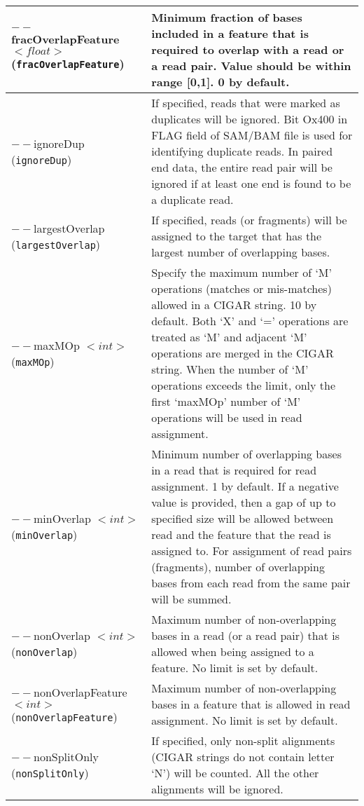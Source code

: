 \documentclass[12pt]{report}
\newcommand{\code}[1]{{\small\texttt{#1}}}
\begin{document}
\begin{longtable}{|p{5cm}|p{11cm}|}
$--$fracOverlapFeature $<float>$ \newline (\code{fracOverlapFeature}) & Minimum fraction of bases included in a feature that is required to overlap with a read or a read pair. Value should be within range [0,1]. 0 by default. \\
\hline
$--$ignoreDup \newline (\code{ignoreDup}) & If specified, reads that were marked as duplicates will be ignored. Bit Ox400 in FLAG field of SAM/BAM file is used for identifying duplicate reads. In paired end data, the entire read pair will be ignored if at least one end is found to be a duplicate read.\\
\hline
$--$largestOverlap \newline (\code{largestOverlap}) & If specified, reads (or fragments) will be assigned to the target that has the largest number of overlapping bases.\\
\hline
$--$maxMOp $<int>$ \newline (\code{maxMOp}) & Specify the maximum number of `M' operations (matches or mis-matches) allowed in a CIGAR string. 10 by default. Both `X' and `=' operations are treated as `M' and adjacent `M' operations are merged in the CIGAR string. When the number of `M' operations exceeds the limit, only the first `maxMOp' number of `M' operations will be used in read assignment.\\
\hline
$--$minOverlap $<int>$ \newline (\code{minOverlap}) & Minimum number of overlapping bases in a read that is required for read assignment. 1 by default. If a negative value is provided, then a gap of up to specified size will be allowed between read and the feature that the read is assigned to. For assignment of read pairs (fragments), number of overlapping bases from each read from the same pair will be summed. \\
\hline
$--$nonOverlap $<int>$ \newline (\code{nonOverlap}) & Maximum number of non-overlapping bases in a read (or a read pair) that is allowed when being assigned to a feature. No limit is set by default. \\
\hline
$--$nonOverlapFeature $<int>$ \newline (\code{nonOverlapFeature}) & Maximum number of non-overlapping bases in a feature that is allowed in read assignment. No limit is set by default. \\
\hline
$--$nonSplitOnly \newline (\code{nonSplitOnly}) & If specified, only non-split alignments (CIGAR strings do not contain letter `N') will be counted. All the other alignments will be ignored.\\

\end{longtable}
\end{document}
